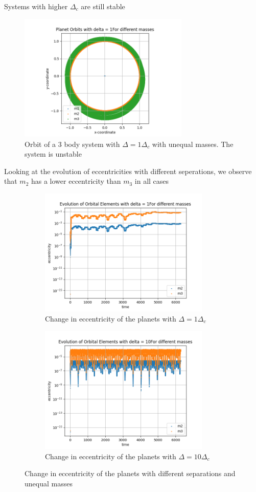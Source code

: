 \documentclass[12pt,a4paper]{article}
\begin{document}
Systems with higher $\Delta_c$ are still stable

\begin{figure}
  \centering
  \includegraphics[height = 2.4in]{3Body/3BD_orbit_delta_21.png}
  \caption{Orbit of a 3 body system with $\Delta = 1\Delta_c$ with unequal masses. The system is unstable}
\end{figure}

Looking at the evolution of eccentricities with different seperations, we observe that $m_2$ has a lower eccentricity than $m_3$ in all cases
\begin{figure}[H]
  \centering
  \begin{subfigure}{0.49\textwidth}
    \centering
    \includegraphics[height = 2.4in]{3Body/3BD_ecc_delta_21.png}
    \caption{Change in eccentricity of the planets with $\Delta = 1\Delta_c$}
  \end{subfigure}
  \begin{subfigure}{0.49\textwidth}
    \centering
    \includegraphics[height = 2.4in]{3Body/3BD_ecc_delta_210.png}
    \caption{Change in eccentricity of the planets with $\Delta = 10\Delta_c$}
  \end{subfigure}
  \caption{Change in eccentricity of the planets with different separations and unequal masses}
\end{figure}
\end{document}
